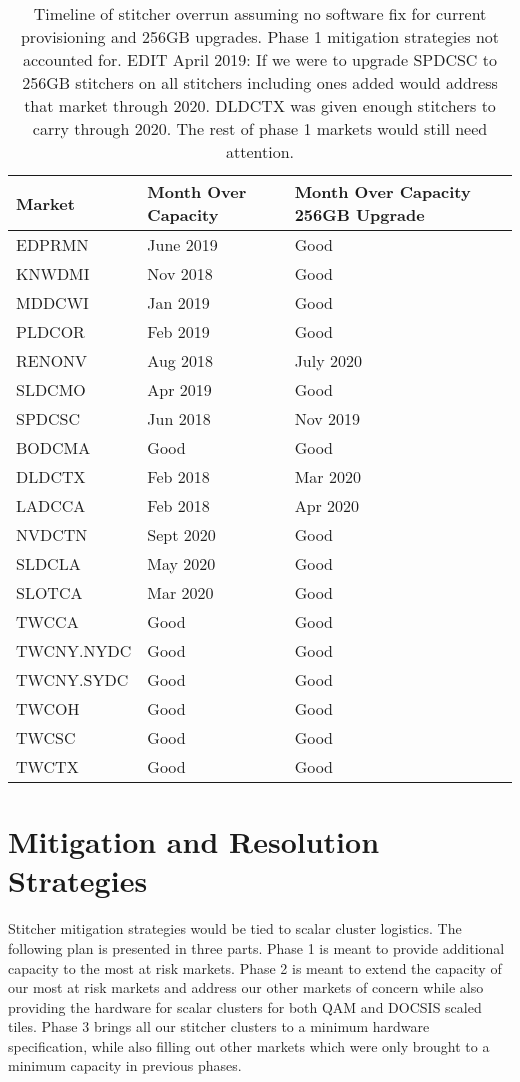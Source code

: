 \documentclass{article}
\begin{document}
\begin{table}
\begin{tabular}{|l|p{22mm}|p{26mm}|} 
\hline Market & Month Over Capacity & Month Over Capacity 256GB Upgrade\\
\hline EDPRMN & June 2019 & Good \\
\hline KNWDMI & Nov 2018 & Good \\
\hline MDDCWI & Jan 2019 & Good \\
\hline PLDCOR & Feb 2019 & Good \\
\hline RENONV & Aug 2018 & July 2020 \\
\hline SLDCMO & Apr 2019 & Good \\
\hline SPDCSC & Jun 2018 & Nov 2019 \\
\hline BODCMA & Good & Good \\
\hline DLDCTX & Feb 2018 & Mar 2020 \\
\hline LADCCA & Feb 2018 & Apr 2020\\
\hline NVDCTN & Sept 2020 & Good \\
\hline SLDCLA & May 2020 & Good \\
\hline SLOTCA & Mar 2020 & Good \\
\hline TWCCA & Good & Good \\
\hline TWCNY.NYDC & Good & Good \\
\hline TWCNY.SYDC & Good & Good \\
\hline TWCOH & Good & Good \\
\hline TWCSC & Good & Good \\
\hline TWCTX & Good & Good \\
\hline 
\end{tabular}
\caption{\label{TABLE-OverrunTimeline}Timeline of stitcher overrun assuming no software fix for current provisioning and 256GB upgrades. Phase 1 mitigation strategies not accounted for. EDIT April 2019: If we were to upgrade SPDCSC to 256GB stitchers on all stitchers including ones added would address that market through 2020. DLDCTX was given enough stitchers to carry through 2020. The rest of phase 1 markets would still need attention.} 
\end{table}

\section{Mitigation and Resolution Strategies}
\label{SECTION-Mitigation}

Stitcher mitigation strategies would be tied to scalar cluster logistics. The following plan is presented in three parts. Phase 1 is meant to provide additional capacity to the most at risk markets. Phase 2 is meant to extend the capacity of our most at risk markets and address our other markets of concern while also providing the hardware for scalar clusters for both QAM and DOCSIS scaled tiles. Phase 3 brings all our stitcher clusters to a minimum hardware specification, while also filling out other markets which were only brought to a minimum capacity in previous phases. 
\end{document}
